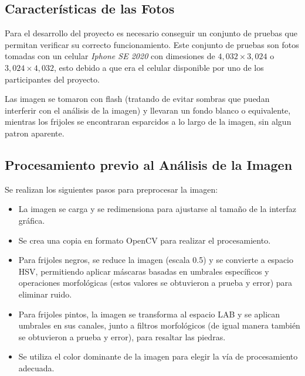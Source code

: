 \documentclass[conference]{IEEEtran}
\begin{document}
    \subsection{Características de las Fotos}
    Para el desarrollo del proyecto es necesario conseguir un conjunto de pruebas que permitan verificar su correcto funcionamiento. Este conjunto de pruebas son fotos tomadas con un celular \textit{Iphone SE 2020}\cite{iphone} con dimesiones de $4,032 \times 3,024$ o $3,024 \times 4,032$, esto debido a que era el celular disponible por uno de los participantes del proyecto.

    Las imagen se tomaron con flash (tratando de evitar sombras que puedan interferir con el análisis de la imagen) y llevaran un fondo blanco o equivalente, mientras los frijoles se encontraran esparcidos a lo largo de la imagen, sin algun patron aparente.

    \subsection{Procesamiento previo al Análisis de la Imagen}
    Se realizan los siguientes pasos para preprocesar la imagen:
    \begin{itemize}
        \item La imagen se carga y se redimensiona para ajustarse al tamaño de la interfaz gráfica.
        \item Se crea una copia en formato OpenCV para realizar el procesamiento.
        \item Para frijoles negros, se reduce la imagen (escala 0.5) y se convierte a espacio HSV, permitiendo aplicar máscaras basadas en umbrales específicos y operaciones morfológicas (estos valores se obtuvieron a prueba y error) para eliminar ruido.
        \item Para frijoles pintos, la imagen se transforma al espacio LAB y se aplican umbrales en sus canales, junto a filtros morfológicos (de igual manera también se obtuvieron a prueba y error), para resaltar las piedras.
        \item Se utiliza el color dominante de la imagen para elegir la vía de procesamiento adecuada.
    \end{itemize}
    
\end{document}
